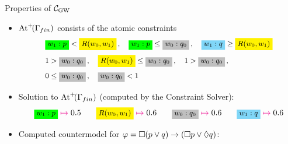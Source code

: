 \begin{frame}{Properties of $\mathcal{C}_{\mathrm{GW}}$}
\begin{itemize}

\item $\mathrm{At}^{+}\!( \Gamma_{fin} )$ consists of the atomic constraints
\[\small
    \begin{array}{l}
 \ggbox{$w_1:p$} < \ycbox{$R(w_0,w_1)$}\,,\quad \ggbox{$w_1:p$}\leq \gcbox{$w_0 : q_0$}\,,\quad
 \ccbox{$w_1 : q$} \geq \ycbox{$R(w_0,w_1)$}\,
\\[2ex] 
 1> \gcbox{$w_0 : q_0$}\,,\quad
\ycbox{$R(w_0,w_1)$}\leq \gcbox{$w_0 : q_0$}\,,\quad
             1 > \gcbox{$w_0 : q_0$}\,,\;\; 
\\[2ex] 
  0 \leq  \gcbox{$w_0 : q_0$}\,,\quad  \gcbox{$w_0 : q_0$}   < 1 
\end{array}
 \]

 \smallskip
\item Solution to $\mathrm{At}^{+}\!( \Gamma_{fin} )$ (computed by the Constraint Solver):
  \[\small
 \ggbox{$w_1:p$}\;\tm{\mapsto}\;0.5
\hspace{2em}
 \ycbox{$R(w_0,w_1)$}\;\tm{\mapsto}\;0.6
\hspace{2em}
\gcbox{$w_0 : q_0$}\;\tm{\mapsto}\; 0.6
\hspace{2em}
 \ccbox{$w_1 : q$} \;\tm{\mapsto}\; 0.6
    \]

  \MP
  \item Computed countermodel for $\varphi =  \Box(p\lor q) \to (\Box p\lor \lozenge q)$:

    \medskip
    
    
\end{itemize}

\end{frame}



